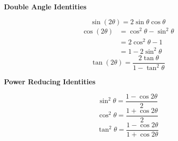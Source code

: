 \documentclass[addpoints]{exam}
\begin{document}
\begin{tcolorbox}[title=Recall: \textit{Fundamental Trigonometric Identities},title filled,colframe=black,sharpish corners,width=\linewidth]
    \vspace{.2in}

    \begin{minipage}[t]{.45\linewidth}
        \begin{center}
            \textbf{Double Angle Identities}
        \end{center}
        \[\sin(2\theta)=2\sin\theta\cos\theta\]
        \begin{align*}
            \cos(2\theta)&=\cos^2\theta-\sin^2\theta\\
            &=2\cos^2\theta-1\\
            &=1-2\sin^2\theta
        \end{align*}
        \[\tan(2\theta)=\frac{2\tan\theta}{1-\tan^2\theta}\]
    \end{minipage}
    \hfil
    \begin{minipage}[t]{.45\linewidth}
        \begin{center}
            \textbf{Power Reducing Identities}
        \end{center}
        \[\sin^2\theta=\frac{1-\cos2\theta}{2}\]
        \[\cos^2\theta=\frac{1+\cos2\theta}{2}\]
        \[\tan^2\theta=\frac{1-\cos2\theta}{1+\cos2\theta}\]
    \end{minipage}
\end{tcolorbox}
\end{document}
